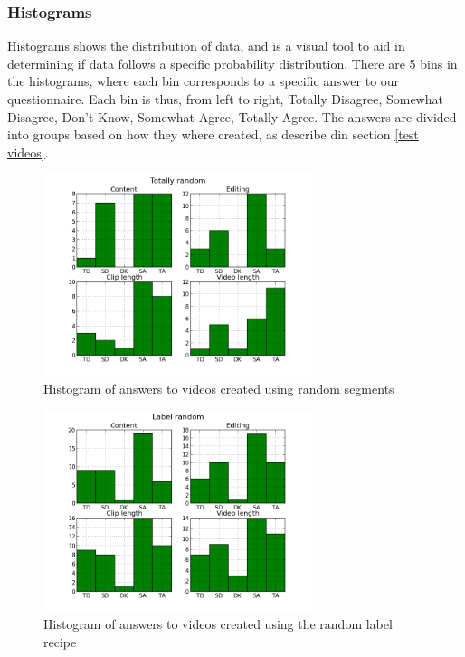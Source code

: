 \subsubsection{Histograms}\label{sec:histograms}
%
Histograms shows the distribution of data, and is a visual tool to aid in determining if data follows a specific probability distribution. There are 5 bins in the histograms, where each bin corresponds to a specific answer to our questionnaire. Each bin is thus, from left to right, Totally Disagree, Somewhat Disagree, Don't Know, Somewhat Agree, Totally Agree. The answers are divided into groups based on how they where created, as describe din section \ref{test videos}.
%
\begin{figure}[!ht]
     \centering
     \includegraphics[width=0.7\textwidth]{img/totallyrandom_barplot.png}
     \caption{Histogram of answers to videos created using random segments}\label{fig:hist_random}
\end{figure}
%
\begin{figure}[!ht]
     \centering
     \includegraphics[width=0.7\textwidth]{img/labelrandom_barplot.png}
     \caption{Histogram of answers to videos created using the random label recipe}\label{fig:hist_labelrandom}
\end{figure}
